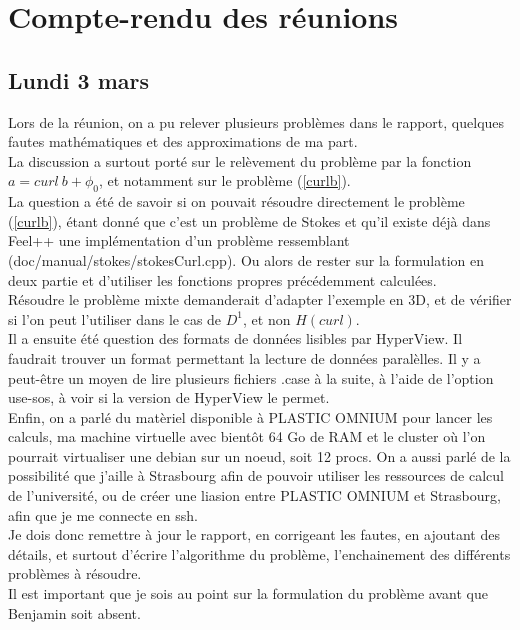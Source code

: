 \section{Compte-rendu des réunions}
\subsection{Lundi 3 mars}

Lors de la réunion, on a pu relever plusieurs problèmes dans le rapport, quelques fautes mathématiques et des approximations de ma part.\\

La discussion a surtout porté sur le relèvement du problème par la fonction $a=curl\ b+\phi_0$, et notamment sur le problème (\ref{curlb}).\\
La question a été de savoir si on pouvait résoudre directement le problème (\ref{curlb}), étant donné que c'est un problème de Stokes et qu'il existe déjà dans Feel++ une implémentation d'un problème ressemblant (doc/manual/stokes/stokesCurl.cpp). Ou alors de rester sur la formulation en deux partie et d'utiliser les fonctions propres précédemment calculées.\\
Résoudre le problème mixte demanderait d'adapter l'exemple en 3D, et de vérifier si l'on peut l'utiliser dans le cas de $D^1$, et non $H(curl)$.\\

Il a ensuite été question des formats de données lisibles par HyperView. Il faudrait trouver un format permettant la lecture de données paralèlles. Il y a peut-être un moyen de lire plusieurs fichiers .case à la suite, à l'aide de l'option use-sos, à voir si la version de HyperView le permet.\\

Enfin, on a parlé du matèriel disponible à PLASTIC OMNIUM pour lancer les calculs, ma machine virtuelle avec bientôt 64 Go de RAM et le cluster où l'on pourrait virtualiser une debian sur un noeud, soit 12 procs. On a aussi parlé de la possibilité que j'aille à Strasbourg afin de pouvoir utiliser les ressources de calcul de l'université, ou de créer une liasion entre PLASTIC OMNIUM et Strasbourg, afin que je me connecte en ssh.\\

Je dois donc remettre à jour le rapport, en corrigeant les fautes, en ajoutant des détails, et surtout d'écrire l'algorithme du problème, l'enchainement des différents problèmes à résoudre.\\
Il est important que je sois au point sur la formulation du problème avant que Benjamin soit absent.

